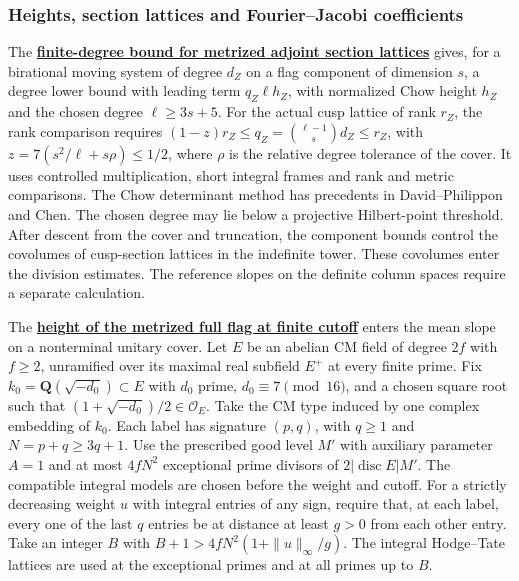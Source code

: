 \documentclass[11pt,a4paper]{article}
\begin{document}
\subsubsection*{Heights, section lattices and Fourier--Jacobi coefficients}
The \textbf{\hyperlink{candidate.height}{finite-degree bound for metrized
adjoint section lattices}} gives, for a birational moving system of degree
\(d_Z\) on a flag component of dimension \(s\), a degree lower bound
with leading term
\(q_Z\ell h_Z\), with normalized Chow height \(h_Z\) and the chosen
degree \(\ell\ge3s+5\). For the actual cusp lattice of rank \(r_Z\),
the rank comparison requires
\((1-z)r_Z\le q_Z=\binom{\ell-1}{s}d_Z\le r_Z\), with
\(z=7(s^2/\ell+s\rho)\le1/2\), where \(\rho\) is the relative
degree tolerance of the cover. It uses controlled multiplication,
short integral frames and rank and metric comparisons. The Chow determinant
method has precedents in David--Philippon and Chen. The chosen degree may
lie below a projective Hilbert-point threshold. After descent from the
cover and truncation, the component bounds control the covolumes of
cusp-section lattices in the indefinite tower. These covolumes enter
the division estimates. The reference slopes on the definite column
spaces require a separate calculation.

The \textbf{\hyperlink{candidate.flag-height}{height of the metrized full flag
at finite cutoff}} enters the mean slope on a nonterminal unitary cover.
Let \(E\) be an abelian CM field of degree \(2f\) with \(f\ge2\),
unramified over its maximal real subfield \(E^+\) at every finite
prime. Fix \(k_0=\mathbf Q(\sqrt{-d_0})\subset E\) with \(d_0\)
prime, \(d_0\equiv7\pmod{16}\), and a chosen square root such that
\((1+\sqrt{-d_0})/2\in\mathcal O_E\). Take the CM type induced by
one complex embedding of \(k_0\).
Each label has signature \((p,q)\), with \(q\ge1\) and \(N=p+q\ge3q+1\).
Use the prescribed good level \(M'\) with auxiliary parameter \(A=1\)
and at most \(4fN^2\) exceptional prime divisors of
\(2|\operatorname{disc}E|M'\). The compatible integral models are
chosen before the weight and cutoff. For a strictly decreasing weight
\(u\) with integral entries of any sign, require that, at each label, every one of the last \(q\) entries
be at distance at least \(g>0\) from each other entry. Take an integer
\(B\) with \(B+1>4fN^2(1+\|u\|_\infty/g)\). The integral Hodge--Tate
lattices are used at the exceptional primes and at all primes up to \(B\).
\end{document}
